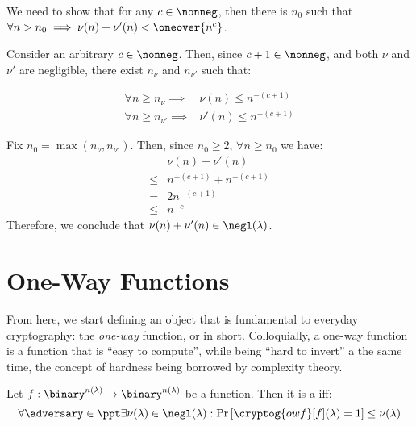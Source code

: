 \begin{solution}[\ref{ex:negl}]

    
    We need to show that for any $c \in \nonneg $, then there is $n_0$ such that $\forall n > n_{0} \implies \nu(n) + \nu'(n) < \oneover{n^c}$.
    
    Consider an arbitrary $c \in \nonneg$. Then, since $c + 1 \in \nonneg$, and both $\nu$ and $\nu'$ are negligible, there exist $n_\nu$ and $n_{\nu'}$ such that:
    
    \begin{align*}
        \forall n \geq n_{\nu} \implies& \nu(n) \leq n^{-(c+1)} \\
        \forall n \geq n_{\nu'} \implies& \nu'(n) \leq n^{-(c+1)}
    \end{align*}

    Fix $n_{0} = \max(n_{\nu}, n_{\nu'})$. Then, since $n_0 \geq 2$, $\forall n \geq n_0$ we have:
    \begin{align*}
        & \nu(n) + \nu'(n) \\
        \leq& n^{-(c+1)} + n^{-(c+1)} \\
        =& 2n^{-(c+1)} \\
        \leq& n^{-c}
    \end{align*}
    Therefore, we conclude that $\nu(n) + \nu'(n) \in \negl(\lambda)$.
\end{solution}


\section{One-Way Functions}

From here, we start defining an object that is fundamental to everyday cryptography: the \emph{one-way} function, or \owf{} in short. Colloquially, a one-way function is a function that is ``easy to compute'', while being ``hard to invert'' a the same time, the concept of hardness being borrowed by complexity theory.

\begin{definition}    
    Let $f : \binary^{n(\lambda)} \to \binary^{n(\lambda)}$ be a function. Then it is a \owf{} iff:
    \[
        \forall \adversary \in \ppt \exists \nu(\lambda) \in \negl(\lambda) : \Pr\left[\cryptog{owf}[f](\lambda) = 1 \right] \leq \nu(\lambda)
    \]
\end{definition}


